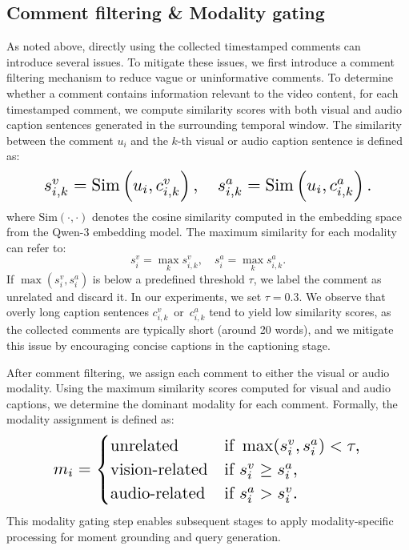 \documentclass[11pt]{article}
\begin{document}
\subsection{Comment filtering \& Modality gating}
\vspace{+.5em}
As noted above, directly using the collected timestamped comments can introduce several issues.
To mitigate these issues, we first introduce a comment filtering mechanism to reduce vague or uninformative comments.
To determine whether a comment contains information relevant to the video content, for each timestamped comment, we compute similarity scores with both visual and audio caption sentences generated in the surrounding temporal window.
The similarity between the comment $u_i$ and the $k$-th visual or audio caption sentence is defined as:
\begin{equation}
\resizebox{0.85\linewidth}{!}{$
s_{i,k}^v=\mathrm{Sim}\left(u_i, c_{i,k}^v\right),
\quad
s_{i,k}^a=\mathrm{Sim}\left(u_i, c_{i,k}^a\right).
$}
\end{equation}
where $\mathrm{Sim}(\cdot,\cdot)$ denotes the cosine similarity computed in the embedding space from the Qwen-3 embedding model.
The maximum similarity for each modality can refer to:
\begin{equation}
s_i^v=\max_k s_{i,k}^v,
\quad
s_i^a=\max_k s_{i,k}^a.
\end{equation}
If $\max(s_i^v, s_i^a)$ is below a predefined threshold $\tau$, we label the comment as unrelated and discard it. In our experiments, we set $\tau = 0.3$.
We observe that overly long caption sentences $c_{i,k}^v \,\text{ or }\, c_{i,k}^a$ tend to yield low similarity scores, as the collected comments are typically short (around 20 words), and we mitigate this issue by encouraging concise captions in the captioning stage.

After comment filtering, we assign each comment to either the visual or audio modality.
Using the maximum similarity scores computed for visual and audio captions, we determine the dominant modality for each comment. Formally, the modality assignment is defined as:
\begin{equation}
\resizebox{0.8\linewidth}{!}{$
m_i=
\begin{cases}
\mathrm{unrelated} & \text{if } \max(s_i^v, s_i^a) < \tau, \\
\mathrm{vision\mbox{-}related} & \text{if } s_i^v \ge s_i^a, \\
\mathrm{audio\mbox{-}related} & \text{if } s_i^a > s_i^v.
\end{cases}
$}
\end{equation}
This modality gating step enables subsequent stages to apply modality-specific processing for moment grounding and query generation.
\end{document}
